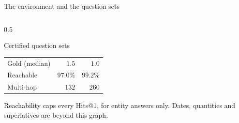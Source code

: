 \begin{frame}{The environment and the question sets}
\begin{columns}[T]
\begin{column}{0.5\textwidth}
\begin{block}{Certified question sets}
\begin{tabular*}{\linewidth}{@{\extracolsep{\fill}}lrr@{}}
          Gold (median)  & $1.5$ & $1.0$ \\
          Reachable      & $97.0\%$ & $99.2\%$ \\
          Multi-hop      & $132$ & $260$ \\
          \bottomrule
        \end{tabular*}
      \end{block}
      {\small\agrraggedright Reachability caps every Hits@1, for entity
      answers only. Dates, quantities and superlatives are beyond this
      graph.\par}
    \end{column}
  \end{columns}
\end{frame}

